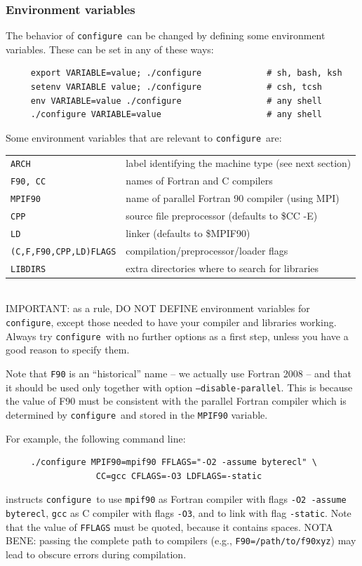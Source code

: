 \documentclass[12pt,a4paper]{article}
\def\configure{\texttt{configure}}
\begin{document}
\subsubsection{Environment variables}
The behavior of \configure\ can be changed by defining some environment
variables. These can be set in any of these ways:
\begin{verbatim}
     export VARIABLE=value; ./configure             # sh, bash, ksh
     setenv VARIABLE value; ./configure             # csh, tcsh
     env VARIABLE=value ./configure                 # any shell
     ./configure VARIABLE=value                     # any shell
\end{verbatim}
Some environment variables that are relevant to \configure\ are:

\begin{tabular}{ll}
\texttt{ARCH}& label identifying the machine type (see next section)\\
\texttt{F90, CC} &names of Fortran and C compilers\\
\texttt{MPIF90} &       name of parallel Fortran 90 compiler (using MPI)\\
\texttt{CPP} &          source file preprocessor (defaults to \$CC -E)\\
\texttt{LD} &           linker (defaults to \$MPIF90)\\
\texttt{(C,F,F90,CPP,LD)FLAGS}& compilation/preprocessor/loader flags\\
\texttt{LIBDIRS}&     extra directories where to search for libraries\\
\end{tabular}\\

IMPORTANT: as a rule, DO NOT DEFINE environment variables for \configure,
except those needed to have your compiler and libraries working.
Always try \configure\ with no further options as a first step,
unless you have a good reason to specify them.

Note that \texttt{F90} is an ``historical'' name -- we actually use
Fortran 2008 -- and that it should be used only together with option
\texttt{--disable-parallel}. This is because the value of F90 must be
consistent with the parallel Fortran compiler which is determined by
\configure\ and stored in the \texttt{MPIF90} variable.

For example, the following command line:
\begin{verbatim}
     ./configure MPIF90=mpif90 FFLAGS="-O2 -assume byterecl" \
                  CC=gcc CFLAGS=-O3 LDFLAGS=-static
\end{verbatim}
instructs \configure\ to use \texttt{mpif90} as Fortran compiler
with flags \texttt{-O2 -assume byterecl}, \texttt{gcc} as C compiler with
flags \texttt{-O3}, and to link with flag \texttt{-static}.
Note that the value of \texttt{FFLAGS} must be quoted, because it contains
spaces. NOTA BENE: passing the complete path to compilers (e.g.,
\texttt{F90=/path/to/f90xyz}) may lead to obscure errors during
compilation.
\end{document}
